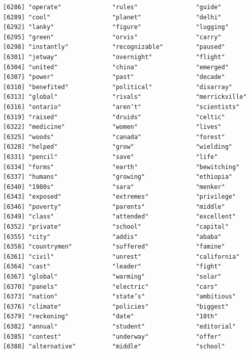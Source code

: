 \documentclass[
  letterpaper,
  DIV=11,
  numbers=noendperiod]{scrartcl}
\begin{document}
\begin{verbatim}
[6286] "operate"              "rules"                "guide"               
[6289] "cool"                 "planet"               "delhi"               
[6292] "lanky"                "figure"               "lugging"             
[6295] "green"                "orvis"                "carry"               
[6298] "instantly"            "recognizable"         "paused"              
[6301] "jetway"               "overnight"            "flight"              
[6304] "united"               "china"                "emerged"             
[6307] "power"                "past"                 "decade"              
[6310] "benefited"            "political"            "disarray"            
[6313] "global"               "rivals"               "merrickville"        
[6316] "ontario"              "aren’t"               "scientists"          
[6319] "raised"               "druids"               "celtic"              
[6322] "medicine"             "women"                "lives"               
[6325] "woods"                "canada"               "forest"              
[6328] "helped"               "grow"                 "wielding"            
[6331] "pencil"               "save"                 "life"                
[6334] "forms"                "earth"                "bewitching"          
[6337] "humans"               "growing"              "ethiopia"            
[6340] "1980s"                "sara"                 "menker"              
[6343] "exposed"              "extremes"             "privilege"           
[6346] "poverty"              "parents"              "middle"              
[6349] "class"                "attended"             "excellent"           
[6352] "private"              "school"               "capital"             
[6355] "city"                 "addis"                "ababa"               
[6358] "countrymen"           "suffered"             "famine"              
[6361] "civil"                "unrest"               "california"          
[6364] "cast"                 "leader"               "fight"               
[6367] "global"               "warming"              "solar"               
[6370] "panels"               "electric"             "cars"                
[6373] "nation"               "state’s"              "ambitious"           
[6376] "climate"              "policies"             "biggest"             
[6379] "reckoning"            "date"                 "10th"                
[6382] "annual"               "student"              "editorial"           
[6385] "contest"              "underway"             "offer"               
[6388] "alternative"          "middle"               "school"              

\end{verbatim}
\end{document}
